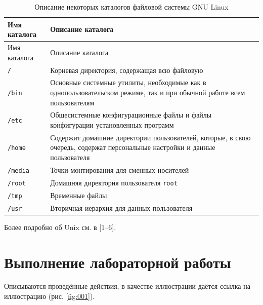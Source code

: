 \documentclass[
  12pt,
  russian,
  a4paper,
]{scrreprt}
\begin{document}
\begin{longtable}[]{@{}
  >{\raggedright\arraybackslash}p{}
  >{\raggedright\arraybackslash}p{}@{}}
\caption{Описание некоторых каталогов файловой системы GNU Linux
\label{tbl:std-dir}}\tabularnewline
\toprule
Имя каталога & Описание каталога \\
\midrule
\endfirsthead
\toprule
Имя каталога & Описание каталога \\
\midrule
\endhead
\texttt{/} & Корневая директория, содержащая всю файловую \\
\texttt{/bin} & Основные системные утилиты, необходимые как в
однопользовательском режиме, так и при обычной работе всем
пользователям \\
\texttt{/etc} & Общесистемные конфигурационные файлы и файлы
конфигурации установленных программ \\
\texttt{/home} & Содержит домашние директории пользователей, которые, в
свою очередь, содержат персональные настройки и данные пользователя \\
\texttt{/media} & Точки монтирования для сменных носителей \\
\texttt{/root} & Домашняя директория пользователя \texttt{root} \\
\texttt{/tmp} & Временные файлы \\
\texttt{/usr} & Вторичная иерархия для данных пользователя \\
\bottomrule
\end{longtable}

Более подробно об Unix см. в {[}1–6{]}.

\hypertarget{ux432ux44bux43fux43eux43bux43dux435ux43dux438ux435-ux43bux430ux431ux43eux440ux430ux442ux43eux440ux43dux43eux439-ux440ux430ux431ux43eux442ux44b}{%
\chapter{Выполнение лабораторной
работы}\label{ux432ux44bux43fux43eux43bux43dux435ux43dux438ux435-ux43bux430ux431ux43eux440ux430ux442ux43eux440ux43dux43eux439-ux440ux430ux431ux43eux442ux44b}}

Описываются проведённые действия, в качестве иллюстрации даётся ссылка
на иллюстрацию (рис. \ref{fig:001}).
\end{document}
